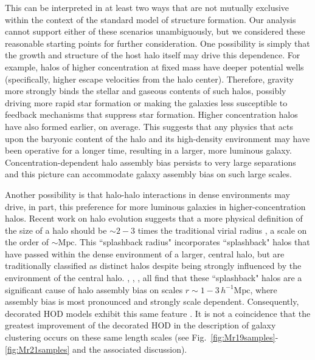 \documentclass[usenatbib,usegraphicx,letterpaper]{mn2e}
\begin{document}
This can be interpreted in at least two ways that are not mutually exclusive within the context of the standard 
model of structure formation. Our analysis cannot support either of these scenarios unambiguously, 
but we considered these reasonable starting points for further consideration. 
One possibility is simply that the growth and structure of the host 
halo itself may drive this dependence. For example, halos of higher concentration at fixed 
mass have deeper potential wells (specifically, higher escape velocities from the halo center). 
Therefore, gravity more strongly binds the stellar and gaseous contents of such halos, possibly 
driving more rapid star formation or making the galaxies less susceptible to feedback mechanisms 
that suppress star formation. Higher concentration halos have also formed earlier, on average. This 
suggests that any physics that acts upon the baryonic content of the halo and its high-density 
environment may have been operative for a longer time, resulting in a larger, more luminous galaxy. 
Concentration-dependent halo assembly bias persists to very large separations 
\citep[$r > 10\, h^{-1}\mathrm{Mpc}$, e.g.,][]{wechsler06} 
and this picture can accommodate galaxy assembly bias on such large scales.


Another possibility is that halo-halo interactions in dense environments may drive, in part, 
this preference for more luminous galaxies in higher-concentration halos. Recent work 
on halo evolution suggests that a more physical definition of the size of a halo should be 
$\sim 2-3$ times the traditional virial radius 
\citep{wetzel_etal14,adhikari_etal14,wetzel_nagai15,sunayama_etal16,more_etal16}, 
a scale on the order of $\sim \mathrm{Mpc}$. 
This ``splashback radius" incorporates ``splashback" halos that have passed within the dense environment 
of a larger, central halo, but are traditionally classified as distinct halos despite being strongly 
influenced by the environment of the central halo. \citet{wang_etal07}, \citet{wetzel_etal14},  
\citet{sunayama_etal16}, all find that these ``splashback" halos are a significant cause 
of halo assembly bias on scales $r \sim 1-3\, h^{-1}\mathrm{Mpc}$, where assembly bias is 
most pronounced and strongly scale dependent. Consequently, decorated HOD models 
exhibit this same feature \citet{hearin_etal16}. It is not a coincidence that the greatest 
improvement of the decorated HOD in the description of galaxy clustering occurs on these same 
length scales (see Fig.~\ref{fig:Mr19samples}-\ref{fig:Mr21samples} and the associated discussion). 
\end{document}
